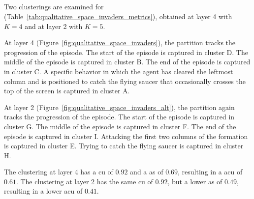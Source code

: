 \cleartoleftpage
\subsection{\SpaceInvadersName}

Two clusterings are examined for \SpaceInvadersName (Table~\ref{tab:qualitative_space_invaders_metrics}), obtained at layer 4 with $K=4$ and at layer 2 with $K=5$.

At layer 4 (Figure~\ref{fig:qualitative_space_invaders}), the partition tracks the progression of the episode.
The start of the episode is captured in cluster D.
The middle of the episode is captured in cluster B.
The end of the episode is captured in cluster C.
A specific behavior in which the agent has cleared the leftmost column and is positioned to catch the flying saucer that occasionally crosses the top of the screen is captured in cluster A.

At layer 2 (Figure~\ref{fig:qualitative_space_invaders_alt}), the partition again tracks the progression of the episode.
The start of the episode is captured in cluster G.
The middle of the episode is captured in cluster F.
The end of the episode is captured in cluster I.
Attacking the first two columns of the formation is captured in cluster E.
Trying to catch the flying saucer is captured in cluster H.

The clustering at layer 4 has a \gls{cu} of $0.92$ and a \gls{as} of $0.69$, resulting in a \gls{acu} of $0.61$.
The clustering at layer 2 has the same \gls{cu} of $0.92$, but a lower \gls{as} of $0.49$, resulting in a lower \gls{acu} of $0.41$.

